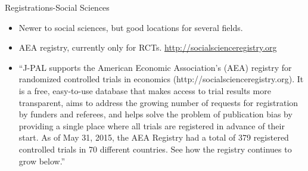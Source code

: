 \documentclass{beamer}
\begin{document}
\begin{frame}[label=regmain]{Registrations-Social Sciences}
\begin{itemize}
   \item Newer to social sciences, but good locations for several fields.
   \item AEA registry, currently only for RCTs. \url{http://socialscienceregistry.org}
   \item
   ``J-PAL supports the American Economic Association's (AEA) registry for randomized controlled trials in economics (http://socialscienceregistry.org). It is a free, easy-to-use database that makes access to trial results more transparent, aims to address the growing number of requests for registration by funders and referees, and helps solve the problem of publication bias by providing a single place where all trials are registered in advance of their start. As of May 31, 2015, the AEA Registry had a total of 379 registered controlled trials in 70 different countries. See how the registry continues to grow below.'' 
 \end{itemize}
 \end{frame}
\end{document}
